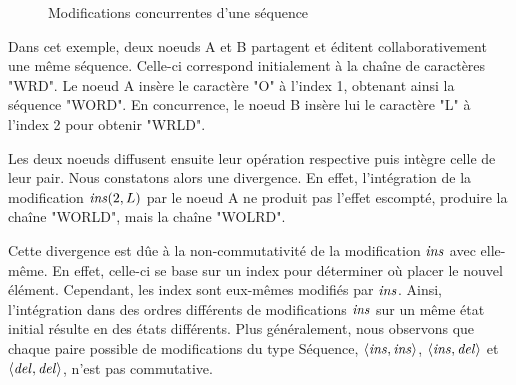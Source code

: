 \begin{figure}[!ht]
{
  }
  \caption{Modifications concurrentes d'une séquence}
  \label{fig:seq-conflit}
\end{figure}

Dans cet exemple, deux noeuds A et B partagent et éditent collaborativement une même séquence.
Celle-ci correspond initialement à la chaîne de caractères "WRD".
Le noeud A insère le caractère "O" à l'index 1, obtenant ainsi la séquence "WORD".
En concurrence, le noeud B insère lui le caractère "L" à l'index 2 pour obtenir "WRLD".

Les deux noeuds diffusent ensuite leur opération respective puis intègre celle de leur pair.
Nous constatons alors une divergence.
En effet, l'intégration de la modification $\mathit{ins}(2,L)$ par le noeud A ne produit pas l'effet escompté, \ie produire la chaîne "WORLD", mais la chaîne "WOLRD".

Cette divergence est dûe à la non-commutativité de la modification $\mathit{ins}$ avec elle-même.
En effet, celle-ci se base sur un index pour déterminer où placer le nouvel élément.
Cependant, les index sont eux-mêmes modifiés par $\mathit{ins}$.
Ainsi, l'intégration dans des ordres différents de modifications $\mathit{ins}$ sur un même état initial résulte en des états différents.
Plus généralement, nous observons que chaque paire possible de modifications du type Séquence, \ie $\langle \mathit{ins},\mathit{ins} \rangle$, $\langle \mathit{ins},\mathit{del} \rangle$ et $\langle \mathit{del},\mathit{del} \rangle$, n'est pas commutative.

